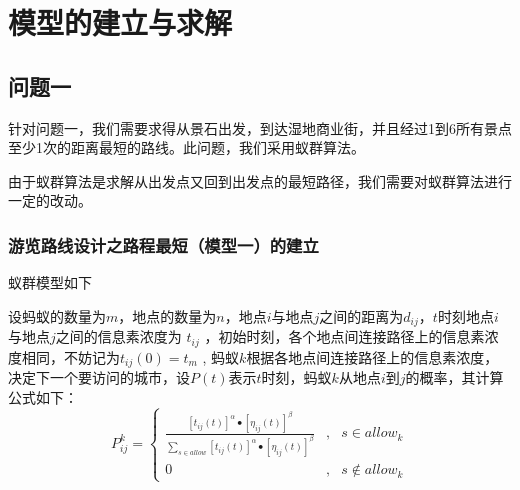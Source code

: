 \documentclass[hyperref,UTF8]{article}
\begin{document}
{\section{模型的建立与求解}


\subsection{问题一}
针对问题一，我们需要求得从景石出发，到达湿地商业街，并且经过1到6所有景点至少1次的距离最短的路线。此问题，我们采用蚁群算法。

由于蚁群算法是求解从出发点又回到出发点的最短路径，我们需要对蚁群算法进行一定的改动。

\subsubsection{游览路线设计之路程最短（模型一）的建立}
蚁群模型如下

设蚂蚁的数量为$m$，地点的数量为$n$，地点$i$与地点$j$之间的距离为$d_{ij}$，$t$时刻地点$i$与地点$j$之间的信息素浓度为
$t_{ij}$ ，初始时刻，各个地点间连接路径上的信息素浓度相同，不妨记为$t_{ij}(0)=t_m$ ,
蚂蚁$k$根据各地点间连接路径上的信息素浓度，决定下一个要访问的城市，设$P(t)$表示$t$时刻，蚂蚁$k$从地点$i$到$j$的概率，其计算公式如下：
\begin{equation}\label{gongshi1}
P_{ij}^k=\left\{
\begin{array}{ccc}
 \frac{[t_{ij}(t)]^{\alpha}\bullet[{\eta}_{ij}(t)]^{\beta}}{{\sum_{s\in allow}}[t_{ij}(t)]^{\alpha}\bullet[{\eta}_{ij}(t)]^{\beta}  } & , & {s\in allow_k} \\
0 & , & {s \notin allow_k}
\end{array} \right.
\end{equation}

}
\end{document}
